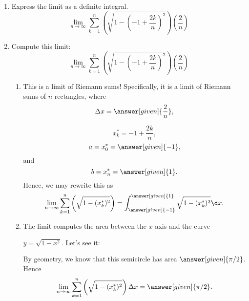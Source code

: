 \documentclass{ximera}
\begin{document}
\begin{example}
\begin{enumerate}


\item Express the limit as a definite integral.
 \[
  \lim_{n\to \infty} \sum_{k=1}^n \left(\sqrt{1-\left(-1+\frac{2k}{n}\right)^2}\right)
  \left(\frac{2}{n}\right)
  \]
  \item Compute this limit:
  \[
  \lim_{n\to \infty} \sum_{k=1}^n \left(\sqrt{1-\left(-1+\frac{2k}{n}\right)^2}\right)
  \left(\frac{2}{n}\right)
  \]

  \begin{explanation}
  \begin{enumerate}
  \item  This is a limit of Riemann sums!  Specifically, it is a limit of
    Riemann sums of $n$ rectangles, where
    \[
    \Delta x = \answer[given]{\frac{2}{n}},
    \]
 
    \[
    x_k^* = -1+\frac{2k}{n},
    \]
    \[
   a= x_0^* = \answer[given]{-1},
    \]
    and
     \[
    b=x_n^* = \answer[given]{1}.
    \]
    Hence, we may rewrite this as
    \[
    \lim_{n\to \infty} \sum_{k=1}^n \left(\sqrt{1-(x_k^*)^2}\right)=\int_{\answer[given]{-1}}^{\answer[given]{1}}\sqrt{1-(x_k^*)^2}
    \d x.
    \]
  \item The limit  computes the area between the $x$-axis and
    the curve
    
     $y = \sqrt{1-x^2}$. Let's see it:
    \begin{image}
    \end{image}
    By geometry, we know that this semicircle has area $\answer[given]{\pi/2}$. Hence
    \[
    \lim_{n\to \infty} \sum_{k=1}^n \left(\sqrt{1-(x_k^*)^2}\right)\Delta x =\answer[given]{\pi/2}.
    \]
     \end{enumerate}
  \end{explanation}
  \end{enumerate}
\end{example}
\end{document}
